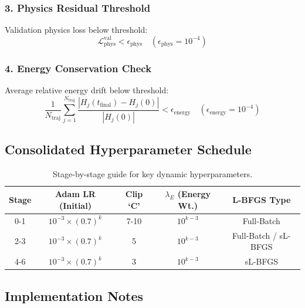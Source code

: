 \subsubsection{3. Physics Residual Threshold}
Validation physics loss below threshold:
\begin{equation}
\mathcal{L}_{\text{phys}}^{\text{val}} < \epsilon_{\text{phys}} \quad (\epsilon_{\text{phys}} = 10^{-4})
\end{equation}

\subsubsection{4. Energy Conservation Check}
Average relative energy drift below threshold:
\begin{equation}
\frac{1}{N_{\text{traj}}} \sum_{j=1}^{N_{\text{traj}}} \frac{|H_j(t_{\text{final}}) - H_j(0)|}{|H_j(0)|} < \epsilon_{\text{energy}} \quad (\epsilon_{\text{energy}} = 10^{-4})
\end{equation}

\subsection{Consolidated Hyperparameter Schedule}

\begin{table}[h!]
\centering
\begin{tabular}{|c|c|c|c|c|}
\hline
\textbf{Stage} & \textbf{Adam LR (Initial)} & \textbf{Clip `C'} & \textbf{$\lambda_E$ (Energy Wt.)} & \textbf{L-BFGS Type} \\
\hline
0-1 & $10^{-3} \times (0.7)^k$ & 7-10 & $10^{k-3}$ & Full-Batch \\
2-3 & $10^{-3} \times (0.7)^k$ & 5 & $10^{k-3}$ & Full-Batch / sL-BFGS \\
4-6 & $10^{-3} \times (0.7)^k$ & 3 & $10^{k-3}$ & sL-BFGS \\
\hline
\end{tabular}
\caption{Stage-by-stage guide for key dynamic hyperparameters.}
\end{table}

\subsection{Implementation Notes}

